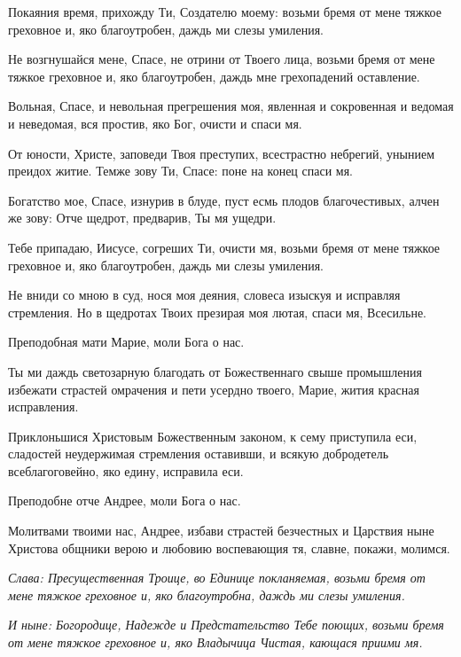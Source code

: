 Покаяния время, прихожду Ти, Создателю моему: возьми бремя от мене тяжкое греховное и, яко благоутробен, даждь ми слезы умиления.


Не возгнушайся мене, Спасе, не отрини от Твоего лица, возьми бремя от мене тяжкое греховное и, яко благоутробен, даждь мне грехопадений оставление.


Вольная, Спасе, и невольная прегрешения моя, явленная и сокровенная и ведомая и неведомая, вся простив, яко Бог, очисти и спаси мя.


От юности, Христе, заповеди Твоя преступих, всестрастно небрегий, унынием преидох житие. Темже зову Ти, Спасе: поне на конец спаси мя.


Богатство мое, Спасе, изнурив в блуде, пуст есмь плодов благочестивых, алчен же зову: Отче щедрот, предварив, Ты мя ущедри.


Тебе припадаю, Иисусе, согреших Ти, очисти мя, возьми бремя от мене тяжкое греховное и, яко благоутробен, даждь ми слезы умиления.


Не вниди со мною в суд, нося моя деяния, словеса изыскуя и исправляя стремления. Но в щедротах Твоих презирая моя лютая, спаси мя, Всесильне.




Преподобная мати Марие, моли Бога о нас.


Ты ми даждь светозарную благодать от Божественнаго свыше промышления избежати страстей омрачения и пети усердно твоего, Марие, жития красная исправления.




Приклоньшися Христовым Божественным законом, к сему приступила еси, сладостей неудержимая стремления оставивши, и всякую добродетель всеблагоговейно, яко едину, исправила еси.


Преподобне отче Андрее, моли Бога о нас.


Молитвами твоими нас, Андрее, избави страстей безчестных и Царствия ныне Христова общники верою и любовию воспевающия тя, славне, покажи, молимся.


\itshape Слава\normalfont{}: Пресущественная Троице, во Единице покланяемая, возьми бремя от мене тяжкое греховное и, яко благоутробна, даждь ми слезы умиления.


\itshape И ныне\normalfont{}: Богородице, Надежде и Предстательство Тебе поющих, возьми бремя от мене тяжкое греховное и, яко Владычица Чистая, кающася приими мя. 


